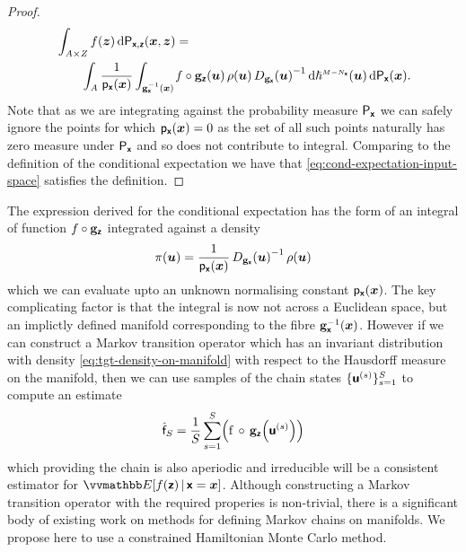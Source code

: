 \begin{proof}
\begin{equation*}
\begin{split}
  &\int_{\set{A} \times \set{Z}}
    f(\vct{z}) 
  \,\dr\prob{\rvct{x},\rvct{z}}(\vct{x},\vct{z}) =\,\\
  &\qquad
  \int_{\set{A}}
  \frac{1}{\pden{\rvct{x}}(\vct{x})}
  \int_{\preimage{\genfunc_{\rvct{x}}}{\vct{x}}}\kern-1pt
   f\circ\genfunc_{\rvct{z}}(\vct{u})\,
   \rho(\vct{u})\,
   \jacobproddet{\genfunc_{\rvct{x}}}{\vct{u}}^{-1}
  \,\dr\haum{M-{N_{\rvct{x}}}}(\vct{u})
  \,\dr\prob{\rvct{x}}(\vct{x}).
\end{split}
\end{equation*}
Note that as we are integrating against the probability measure $\mathsf{P}_{\boldsymbol{\mathsf{x}}}$ we can safely ignore the points for which $\mathsf{p}_{\boldsymbol{\mathsf{x}}}(\boldsymbol{x}) = 0$ as the set of all such points naturally has zero measure under $\mathsf{P}_{\boldsymbol{\mathsf{x}}}$ and so does not contribute to integral. Comparing to the definition of the conditional expectation we have that \eqref{eq:cond-expectation-input-space} satisfies the definition. \qedhere
\end{proof}

The expression derived for the conditional expectation has the form of an integral of function $f \circ {\mathbf{g}}_{\boldsymbol{\mathsf{z}}}$ integrated against a density
\begin{equation}\label{eq:tgt-density-on-manifold}
    \pi(\vct{u}) =
    \frac{1}{\pden{\rvct{x}}(\vct{x})}\,
    \jacobproddet{\genfunc_{\rvct{x}}}{\vct{u}}^{-1}\,
    \rho(\vct{u}) 
\end{equation}
which we can evaluate upto an unknown normalising constant $\mathsf{p}_{\boldsymbol{\mathsf{x}}}(\boldsymbol{x})$. The key complicating factor is that the integral is now not across a Euclidean space, but an implictly defined manifold corresponding to the fibre ${\mathbf{g}}_{\boldsymbol{\mathsf{x}}}^{-1}(\boldsymbol{x})$. However if we can construct a Markov transition operator which has an invariant distribution with density \eqref{eq:tgt-density-on-manifold} with respect to the Hausdorff measure on the manifold, then we can use samples of the chain states $\lbrace\boldsymbol{\mathsf{u}}^{(s)}\rbrace_{s=1}^S$ to compute an estimate
\begin{equation}\label{eq:mc-est-cond-expc}
    \hat{\rvar{f}}_S =
    \frac{1}{S} 
    \sum_{s=1}^S \lpa
      \func{f}\,\circ\,\genfunc_{\rvct{z}}\lpa\rvct{u}^{(s)}\rpa
    \rpa
\end{equation}
which providing the chain is also aperiodic and irreducible will be a consistent estimator for $\expc{f(\rvct{z}) \gvn \rvct{x} = \vct{x}}$. Although constructing a Markov transition operator with the required properies is non-trivial, there is a significant body of existing work on methods for defining Markov chains on manifolds. We propose here to use a constrained Hamiltonian Monte Carlo method.

